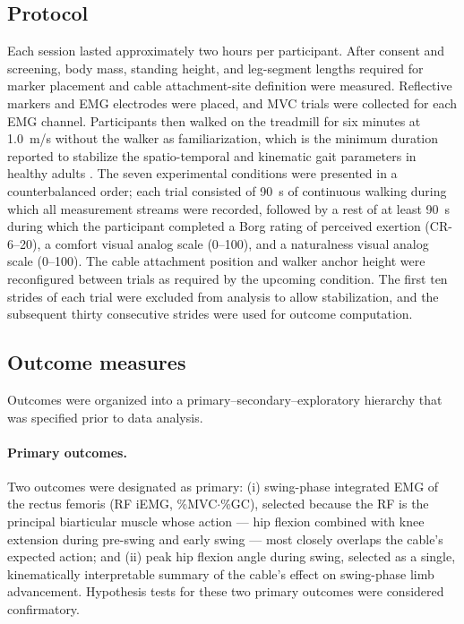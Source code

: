\documentclass[11pt,a4paper]{article}
\begin{document}
\subsection{Protocol}
Each session lasted approximately two hours per participant. After consent and screening, body mass, standing height, and leg-segment lengths required for marker placement and cable attachment-site definition were measured. Reflective markers and EMG electrodes were placed, and MVC trials were collected for each EMG channel. Participants then walked on the treadmill for six minutes at 1.0~m/s without the walker as familiarization, which is the minimum duration reported to stabilize the spatio-temporal and kinematic gait parameters in healthy adults \citep{meyer2019}. The seven experimental conditions were presented in a counterbalanced order; each trial consisted of 90~s of continuous walking during which all measurement streams were recorded, followed by a rest of at least 90~s during which the participant completed a Borg rating of perceived exertion (CR-6--20), a comfort visual analog scale (0--100), and a naturalness visual analog scale (0--100). The cable attachment position and walker anchor height were reconfigured between trials as required by the upcoming condition. The first ten strides of each trial were excluded from analysis to allow stabilization, and the subsequent thirty consecutive strides were used for outcome computation.

\subsection{Outcome measures}
Outcomes were organized into a primary--secondary--exploratory hierarchy that was specified prior to data analysis.

\paragraph{Primary outcomes.}
Two outcomes were designated as primary: (i) swing-phase integrated EMG of the rectus femoris (RF iEMG, \%MVC$\cdot$\%GC), selected because the RF is the principal biarticular muscle whose action — hip flexion combined with knee extension during pre-swing and early swing — most closely overlaps the cable's expected action; and (ii) peak hip flexion angle during swing, selected as a single, kinematically interpretable summary of the cable's effect on swing-phase limb advancement. Hypothesis tests for these two primary outcomes were considered confirmatory.
\end{document}
